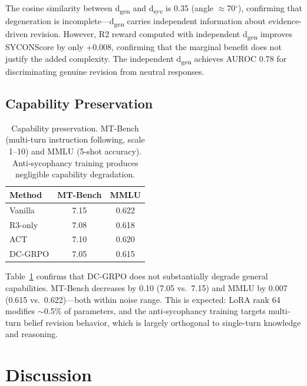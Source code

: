 \documentclass[11pt,a4paper]{article}
\begin{document}
The cosine similarity between d\textsubscript{gen} and d\textsubscript{syc} is 0.35 (angle $\approx$70$^\circ$), confirming that degeneration is incomplete---d\textsubscript{gen} carries independent information about evidence-driven revision.
However, R2 reward computed with independent d\textsubscript{gen} improves SYCONScore by only +0.008, confirming that the marginal benefit does not justify the added complexity.
The independent d\textsubscript{gen} achieves AUROC 0.78 for discriminating genuine revision from neutral responses.

\subsection{Capability Preservation}
\label{sec:capability}

\begin{table}[t]
\centering
\small
\caption{Capability preservation. MT-Bench (multi-turn instruction following, scale 1--10) and MMLU (5-shot accuracy). Anti-sycophancy training produces negligible capability degradation.}
\label{tab:capability}
\begin{tabular}{@{}lcc@{}}
\toprule
Method & MT-Bench & MMLU \\
\midrule
Vanilla & 7.15 & 0.622 \\
R3-only & 7.08 & 0.618 \\
ACT & 7.10 & 0.620 \\
DC-GRPO & 7.05 & 0.615 \\
\bottomrule
\end{tabular}
\end{table}

Table~\ref{tab:capability} confirms that DC-GRPO does not substantially degrade general capabilities.
MT-Bench decreases by 0.10 (7.05 vs.\ 7.15) and MMLU by 0.007 (0.615 vs.\ 0.622)---both within noise range.
This is expected: LoRA rank 64 modifies $\sim$0.5\% of parameters, and the anti-sycophancy training targets multi-turn belief revision behavior, which is largely orthogonal to single-turn knowledge and reasoning.

\section{Discussion}
\end{document}
